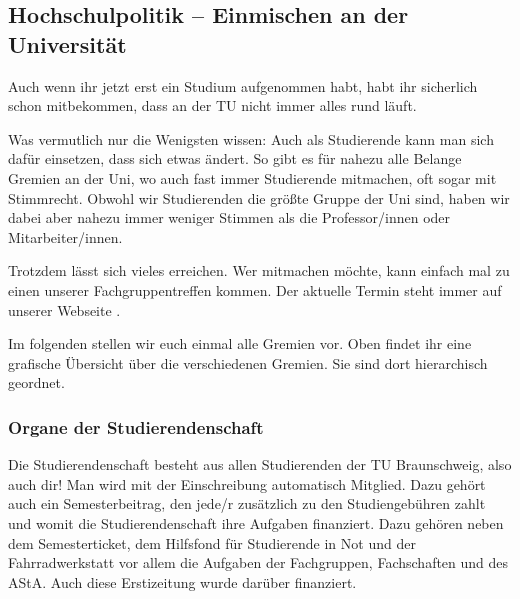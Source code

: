 \subsection{Hochschulpolitik -- Einmischen an der Universität}

Auch wenn ihr jetzt erst ein Studium aufgenommen habt, habt ihr sicherlich 
schon mitbekommen, dass an der TU nicht immer alles rund läuft.

Was vermutlich nur die Wenigsten wissen: Auch als Studierende kann man sich 
dafür einsetzen, dass sich etwas ändert. So gibt es für nahezu alle Belange Gremien 
an der Uni, wo auch fast immer Studierende mitmachen, oft sogar mit Stimmrecht. 
Obwohl wir Studierenden die größte Gruppe der Uni sind, haben wir dabei aber nahezu immer 
weniger Stimmen als die Professor/innen oder Mitarbeiter/innen. 

Trotzdem lässt sich vieles erreichen. Wer mitmachen möchte, kann einfach 
mal zu einen unserer Fachgruppentreffen kommen. Der aktuelle Termin steht immer 
 auf unserer Webseite \fginfoUrl.

Im folgenden stellen wir euch einmal alle Gremien vor.
Oben findet ihr eine grafische Übersicht über die verschiedenen Gremien. Sie sind dort hierarchisch geordnet.

\subsubsection*{Organe der Studierendenschaft}

Die Studierendenschaft besteht aus allen Studierenden der TU Braunschweig, also auch dir!
Man wird mit der Einschreibung automatisch Mitglied. Dazu gehört auch ein Semesterbeitrag, den jede/r 
zusätzlich zu den Studiengebühren zahlt und womit die Studierendenschaft ihre Aufgaben finanziert. 
Dazu gehören neben dem Semesterticket, dem Hilfsfond für Studierende in Not und der 
Fahrradwerkstatt vor allem die Aufgaben der Fachgruppen, Fachschaften und des AStA. Auch diese
Erstizeitung wurde darüber finanziert.

